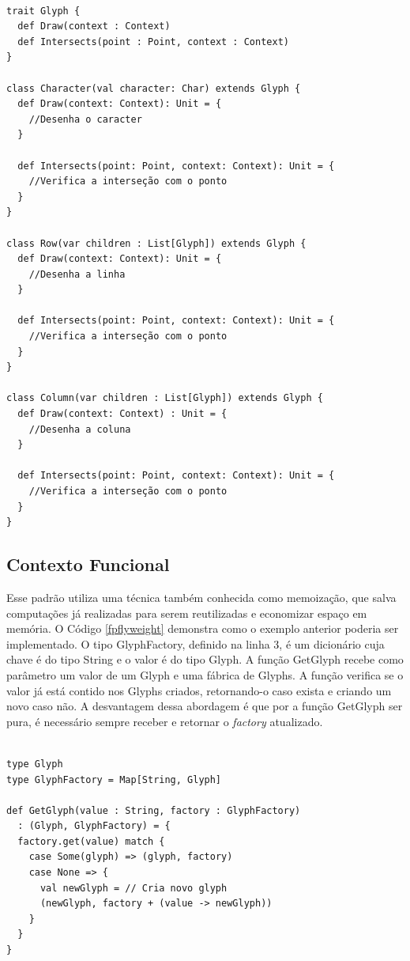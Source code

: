 \begin{lstlisting}[caption={Flyweight Orientado a Objetos.},label=ooflyweight]

trait Glyph {
  def Draw(context : Context)
  def Intersects(point : Point, context : Context)
}

class Character(val character: Char) extends Glyph {
  def Draw(context: Context): Unit = {
    //Desenha o caracter
  }

  def Intersects(point: Point, context: Context): Unit = {
    //Verifica a interseção com o ponto
  }
}

class Row(var children : List[Glyph]) extends Glyph {
  def Draw(context: Context): Unit = {
    //Desenha a linha
  }

  def Intersects(point: Point, context: Context): Unit = {
    //Verifica a interseção com o ponto
  }
}

class Column(var children : List[Glyph]) extends Glyph {
  def Draw(context: Context) : Unit = {
    //Desenha a coluna
  }

  def Intersects(point: Point, context: Context): Unit = {
    //Verifica a interseção com o ponto
  }
}

\end{lstlisting}

\subsection*{Contexto Funcional}

Esse padrão utiliza uma técnica também conhecida 
como memoização, que salva computações já realizadas 
para serem reutilizadas e economizar espaço em 
memória\cite{scalafunctpatterns}. O Código \ref{fpflyweight} 
demonstra como o exemplo anterior poderia ser 
implementado. O tipo GlyphFactory, definido na 
linha 3, é um dicionário cuja chave é do tipo 
String e o valor é do tipo Glyph. A função 
GetGlyph recebe como parâmetro um valor de um 
Glyph e uma fábrica de Glyphs. A função verifica 
se o valor já está contido nos Glyphs criados, 
retornando-o caso exista e criando um novo 
caso não. A desvantagem dessa abordagem é que 
por a função GetGlyph ser pura, é necessário 
sempre receber e retornar o \textit{factory} 
atualizado.

\begin{lstlisting}[caption={Flyweight Funcional.},label=fpflyweight]
    
type Glyph
type GlyphFactory = Map[String, Glyph]

def GetGlyph(value : String, factory : GlyphFactory)
  : (Glyph, GlyphFactory) = {
  factory.get(value) match {
    case Some(glyph) => (glyph, factory)
    case None => {
      val newGlyph = // Cria novo glyph 
      (newGlyph, factory + (value -> newGlyph))
    }
  }
}
    
\end{lstlisting}